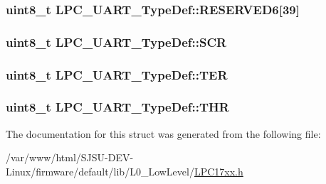 \subsubsection[{\texorpdfstring{R\+E\+S\+E\+R\+V\+E\+D6}{RESERVED6}}]{\setlength{\rightskip}{0pt plus 5cm}uint8\+\_\+t L\+P\+C\+\_\+\+U\+A\+R\+T\+\_\+\+Type\+Def\+::\+R\+E\+S\+E\+R\+V\+E\+D6\mbox{[}39\mbox{]}}\hypertarget{structLPC__UART__TypeDef_a02f6e44a93ef057eb9094bb8e625598e}{}\label{structLPC__UART__TypeDef_a02f6e44a93ef057eb9094bb8e625598e}
\subsubsection[{\texorpdfstring{S\+CR}{SCR}}]{ uint8\+\_\+t L\+P\+C\+\_\+\+U\+A\+R\+T\+\_\+\+Type\+Def\+::\+S\+CR}\hypertarget{structLPC__UART__TypeDef_a0c0d836bbcf6de3752b0db2146d54aff}{}\label{structLPC__UART__TypeDef_a0c0d836bbcf6de3752b0db2146d54aff}
\subsubsection[{\texorpdfstring{T\+ER}{TER}}]{ uint8\+\_\+t L\+P\+C\+\_\+\+U\+A\+R\+T\+\_\+\+Type\+Def\+::\+T\+ER}\hypertarget{structLPC__UART__TypeDef_a9669e26ff888ff51aad1218a052a7bcb}{}\label{structLPC__UART__TypeDef_a9669e26ff888ff51aad1218a052a7bcb}
\subsubsection[{\texorpdfstring{T\+HR}{THR}}]{ uint8\+\_\+t L\+P\+C\+\_\+\+U\+A\+R\+T\+\_\+\+Type\+Def\+::\+T\+HR}\hypertarget{structLPC__UART__TypeDef_a5e587bae4b1f3a14cbdeec2e2a3e84a7}{}\label{structLPC__UART__TypeDef_a5e587bae4b1f3a14cbdeec2e2a3e84a7}


The documentation for this struct was generated from the following file\+:\begin{DoxyCompactItemize}
\item 
/var/www/html/\+S\+J\+S\+U-\/\+D\+E\+V-\/\+Linux/firmware/default/lib/\+L0\+\_\+\+Low\+Level/\hyperlink{LPC17xx_8h}{L\+P\+C17xx.\+h}\end{DoxyCompactItemize}
